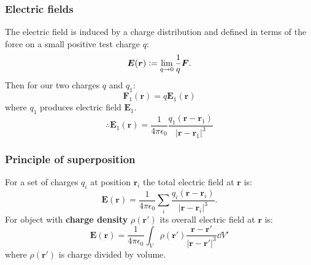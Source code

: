 \documentclass{article}
\newcommand{\deq}{\vcentcolon=}
\newcommand{\vc}[1]{\boldsymbol{#1}}
\begin{document}
\begin{multicols*}{3}
\subsubsection*{Electric fields}
The electric field is induced by a charge distribution
and defined in terms of the
force on a small positive test charge $q$:
$$\vc{E}(\vc{r})\deq\lim_{q\rightarrow0}
\frac{1}{q}\vc{F}.$$
Then for our two charges $q$ and $q_1$:
$$\vc{F}_1(\vc{r})=q\vc{E}_1(\vc{r})$$
where $q_1$ produces electric field $\vc{E}_1$.
$$\therefore\vc{E}_1(\vc{r})
=\frac{1}{4\pi\epsilon_0}
\frac{q_1(\vc{r}-\vc{r}_1)}{|\vc{r}-\vc{r}_1|^3}$$

\subsubsection*{Principle of superposition}
For a set of charges $q_i$ at position $\vc{r}_i$
the total electric field at $\vc{r}$ is:
$$\vc{E}(\vc{r})=\frac{1}{4\pi\epsilon_0}
\sum_i\frac{q_i(\vc{r}-\vc{r}_i)}{|\vc{r}-\vc{r}_i|^3}.$$
For object with \textbf{charge density}
$\rho(\vc{r}')$ its overall electric field at $\vc{r}$ is:
$$\vc{E}(\vc{r})=\frac{1}{4\pi\epsilon_0}
\int_V\rho(\vc{r}')
\frac{\vc{r}-\vc{r}'}{|\vc{r}-\vc{r}'|^3}\dd V'$$
where $\rho(\vc{r}')$ is charge divided by volume.


\end{multicols*}
\end{document}
